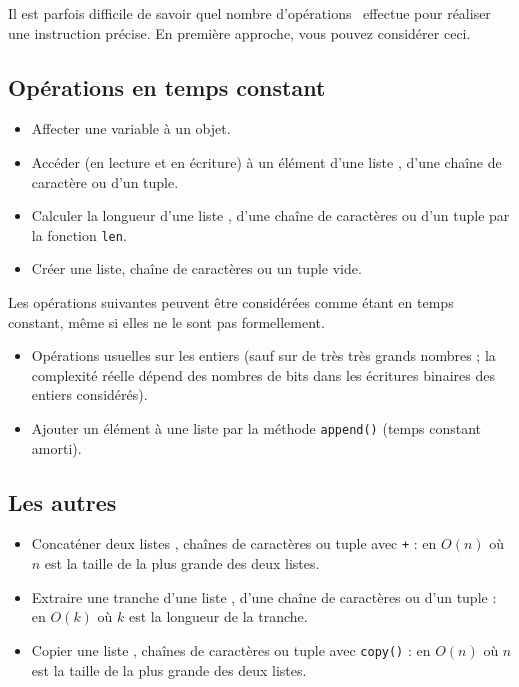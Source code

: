Il est parfois difficile de savoir quel nombre d'opérations \python\ effectue pour réaliser une instruction précise. 
En première approche, vous pouvez considérer ceci.

\subsection{Opérations en temps constant}

\begin{itemize}
  \item Affecter une variable à un objet.
  \item Accéder (en lecture et en écriture) à un élément d'une liste \python, d'une chaîne de caractère ou d'un tuple. 
  \item Calculer la longueur d'une liste \python, d'une chaîne de caractères ou d'un tuple par la fonction \texttt{len}.
  \item Créer une liste, chaîne de caractères ou un tuple vide.
\end{itemize}

Les opérations suivantes peuvent être considérées comme étant en temps constant, même si elles ne le sont pas formellement.

\begin{itemize}
  \item Opérations usuelles sur les entiers (sauf sur de très très grands nombres ; la complexité réelle dépend des nombres de bits dans les écritures binaires des entiers considérés).
  \item Ajouter un élément à une liste par la méthode \texttt{append()} (temps constant amorti).
\end{itemize}

\subsection{Les autres}

\begin{itemize}
  \item Concaténer deux listes \python, chaînes de caractères ou tuple avec \texttt{+} : en $O(n)$ où $n$ est la taille de la plus grande des deux listes.
  \item Extraire une tranche d'une liste \python, d'une chaîne de caractères ou d'un tuple : en $O(k)$ où $k$ est la longueur de la tranche.
  \item Copier une liste \python, chaînes de caractères ou tuple avec \texttt{copy()} : en $O(n)$ où $n$ est la taille de la plus grande des deux listes.
\end{itemize}

